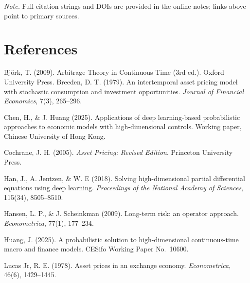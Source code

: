 ﻿\documentclass[11pt,letterpaper,oneside]{article}
\numberwithin{equation}{section}
\newcommand{\1}{\mathbf{1}}
\begin{document}
\medskip
\noindent\emph{Note.} Full citation strings and DOIs are provided in the online notes; links above point to primary sources.

\clearpage
\section*{References}
\begin{thebibliography}{99}\small
{} Bj\"ork, T. (2009).
Arbitrage Theory in Continuous Time (3rd ed.).
Oxford University Press.
 Breeden, D. T. (1979).
An intertemporal asset pricing model with stochastic consumption and investment opportunities.
\emph{Journal of Financial Economics}, 7(3), 265--296.

 Chen, H., \& J. Huang (2025).
Applications of deep learning-based probabilistic approaches to economic models with high-dimensional controls.
Working paper, Chinese University of Hong Kong.

 Cochrane, J. H. (2005).
\emph{Asset Pricing: Revised Edition}.
Princeton University Press.

 Han, J., A. Jentzen, \& W. E (2018).
Solving high-dimensional partial differential equations using deep learning.
\emph{Proceedings of the National Academy of Sciences}, 115(34), 8505--8510.

 Hansen, L. P., \& J. Scheinkman (2009).
Long-term risk: an operator approach.
\emph{Econometrica}, 77(1), 177--234.

 Huang, J. (2025).
A probabilistic solution to high-dimensional continuous-time macro and finance models.
CESifo Working Paper No.~10600.

 Lucas Jr, R. E. (1978).
Asset prices in an exchange economy.
\emph{Econometrica}, 46(6), 1429--1445.
\end{thebibliography}
\end{document}
